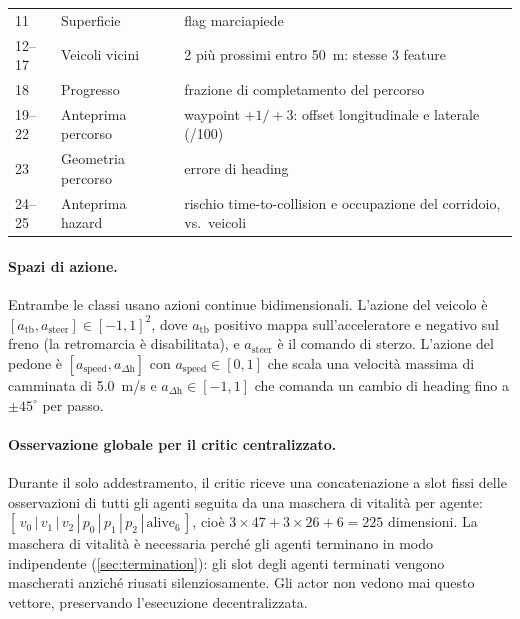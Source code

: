 \begin{table}[t]
\begin{tabular}{@{}llp{8.0cm}@{}}
    11     & Superficie       & flag marciapiede \\
    12--17 & Veicoli vicini   & 2 più prossimi entro \SI{50}{m}: stesse 3 feature \\
    18     & Progresso        & frazione di completamento del percorso \\
    19--22 & Anteprima percorso & waypoint $+1/+3$: offset longitudinale e laterale (/100) \\
    23     & Geometria percorso & errore di heading \\
    24--25 & Anteprima hazard & rischio time-to-collision e occupazione del corridoio, vs.\ veicoli \\
    \bottomrule
  \end{tabular}
\end{table}

\paragraph{Spazi di azione.}
Entrambe le classi usano azioni continue bidimensionali. L'azione del
veicolo è $[a_{\mathrm{tb}}, a_{\mathrm{steer}}] \in [-1,1]^2$, dove
$a_{\mathrm{tb}}$ positivo mappa sull'acceleratore e negativo sul freno
(la retromarcia è disabilitata), e $a_{\mathrm{steer}}$ è il comando di
sterzo. L'azione del pedone è
$[a_{\mathrm{speed}}, a_{\Delta\mathrm{h}}]$ con
$a_{\mathrm{speed}} \in [0,1]$ che scala una velocità massima di
camminata di \SI{5.0}{m/s} e $a_{\Delta\mathrm{h}} \in [-1,1]$ che
comanda un cambio di heading fino a $\pm 45^{\circ}$ per passo.

\paragraph{Osservazione globale per il critic centralizzato.}
Durante il solo addestramento, il critic riceve una concatenazione a
slot fissi delle osservazioni di tutti gli agenti seguita da una
maschera di vitalità per agente:
$[\,v_0\,|\,v_1\,|\,v_2\,|\,p_0\,|\,p_1\,|\,p_2\,|\,\text{alive}_{6}\,]$,
cioè $3 \times 47 + 3 \times 26 + 6 = 225$ dimensioni. La maschera di
vitalità è necessaria perché gli agenti terminano in modo indipendente
(\cref{sec:termination}): gli slot degli agenti terminati vengono
mascherati anziché riusati silenziosamente. Gli actor non vedono mai
questo vettore, preservando l'esecuzione decentralizzata.

